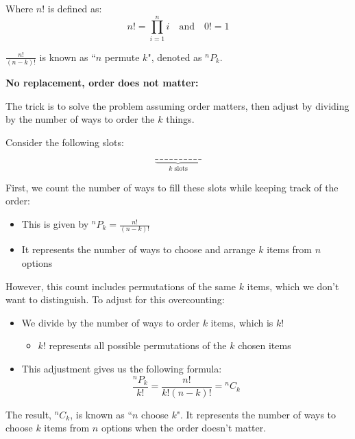 \documentclass{article}
\begin{document}
Where $n!$ is defined as:
\[
    n! = \prod_{i=1}^{n} i \quad \text{and} \quad 0! = 1
\]

\vspace{0.3cm}

\noindent
$\frac{n!}{(n-k)!}$ is known as ``$n$ permute $k$", denoted as ${}^nP_k$.

\vspace{0.5cm}

\noindent
\textbf{No replacement, order does not matter:}

\noindent
The trick is to solve the problem assuming order matters, then adjust by dividing by the number of ways to order the $k$ things.

\vspace{0.3cm}

\noindent
Consider the following slots:

\[
\underbrace{\_\,\_\,\_\,\_\,\_\,\_\,\_\,\_\,\_\,\_}_{k\text{ slots}}
\]

\noindent
First, we count the number of ways to fill these slots while keeping track of the order:
\begin{itemize}
    \item This is given by ${}^nP_k = \frac{n!}{(n-k)!}$
    \item It represents the number of ways to choose and arrange $k$ items from $n$ options
\end{itemize}

However, this count includes permutations of the same $k$ items, which we don't want to distinguish. To adjust for this overcounting:
\begin{itemize}
    \item We divide by the number of ways to order $k$ items, which is $k!$
        \begin{itemize}
            \item $k!$ represents all possible permutations of the $k$ chosen items
        \end{itemize}
    \item This adjustment gives us the following formula:
        \[ \frac{{}^nP_k}{k!} = \frac{n!}{k!(n-k)!} = {}^nC_k \]
\end{itemize}

The result, ${}^nC_k$, is known as ``$n$ choose $k$". It represents the number of ways to choose $k$ items from $n$ options when the order doesn't matter.
\end{document}
